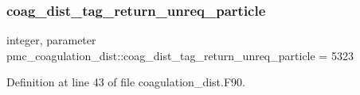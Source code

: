 \subsubsection{\texorpdfstring{coag\+\_\+dist\+\_\+tag\+\_\+return\+\_\+unreq\+\_\+particle}{coag\_dist\_tag\_return\_unreq\_particle}}
{\footnotesize\ttfamily integer, parameter pmc\+\_\+coagulation\+\_\+dist\+::coag\+\_\+dist\+\_\+tag\+\_\+return\+\_\+unreq\+\_\+particle = 5323}



Definition at line 43 of file coagulation\+\_\+dist.\+F90.

